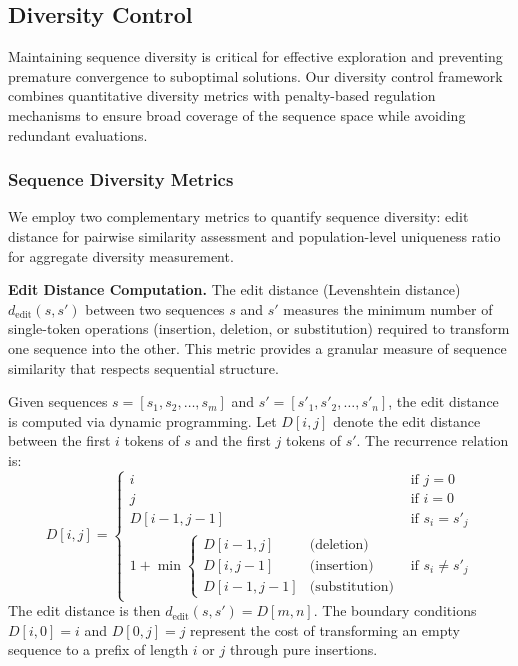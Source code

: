 \subsection{Diversity Control}

Maintaining sequence diversity is critical for effective exploration and preventing premature convergence to suboptimal solutions. Our diversity control framework combines quantitative diversity metrics with penalty-based regulation mechanisms to ensure broad coverage of the sequence space while avoiding redundant evaluations.

\subsubsection{Sequence Diversity Metrics}

We employ two complementary metrics to quantify sequence diversity: edit distance for pairwise similarity assessment and population-level uniqueness ratio for aggregate diversity measurement.

\textbf{Edit Distance Computation.} The edit distance (Levenshtein distance) $d_{\text{edit}}(s, s')$ between two sequences $s$ and $s'$ measures the minimum number of single-token operations (insertion, deletion, or substitution) required to transform one sequence into the other. This metric provides a granular measure of sequence similarity that respects sequential structure.

Given sequences $s = [s_1, s_2, \ldots, s_m]$ and $s' = [s'_1, s'_2, \ldots, s'_n]$, the edit distance is computed via dynamic programming. Let $D[i,j]$ denote the edit distance between the first $i$ tokens of $s$ and the first $j$ tokens of $s'$. The recurrence relation is:
%
\begin{equation}
D[i,j] = \begin{cases}
i & \text{if } j = 0 \\
j & \text{if } i = 0 \\
D[i-1,j-1] & \text{if } s_i = s'_j \\
1 + \min\begin{cases}
D[i-1,j] & \text{(deletion)} \\
D[i,j-1] & \text{(insertion)} \\
D[i-1,j-1] & \text{(substitution)}
\end{cases} & \text{if } s_i \neq s'_j
\end{cases}
\end{equation}
%
The edit distance is then $d_{\text{edit}}(s, s') = D[m,n]$. The boundary conditions $D[i,0] = i$ and $D[0,j] = j$ represent the cost of transforming an empty sequence to a prefix of length $i$ or $j$ through pure insertions.

